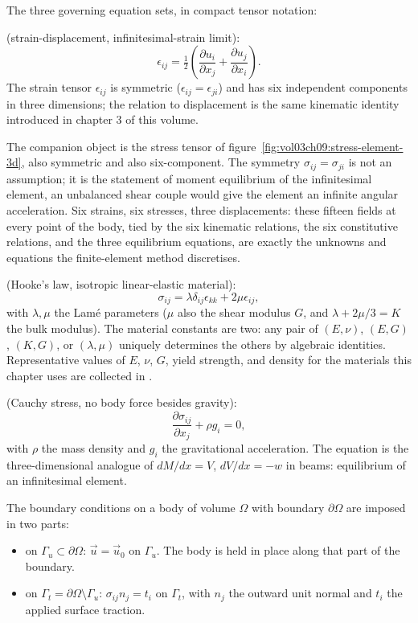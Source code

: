 The three governing equation sets, in compact tensor notation:

 (strain-displacement, infinitesimal-strain
limit):
\[
\epsilon_{ij} = \tfrac{1}{2}\left(\frac{\partial u_i}{\partial x_j}
+ \frac{\partial u_j}{\partial x_i}\right).
\]
The strain tensor $\epsilon_{ij}$ is symmetric ($\epsilon_{ij} =
\epsilon_{ji}$) and has six independent components in three
dimensions; the relation to displacement is the same kinematic
identity introduced in chapter 3 of this volume.



The companion object is the stress tensor of
figure~\ref{fig:vol03ch09:stress-element-3d}, also symmetric and also
six-component. The symmetry $\sigma_{ij} = \sigma_{ji}$ is not an
assumption; it is the statement of moment equilibrium of the
infinitesimal element, an unbalanced shear couple would give the
element an infinite angular acceleration. Six strains, six stresses,
three displacements: these fifteen fields at every point of the body,
tied by the six kinematic relations, the six constitutive relations,
and the three equilibrium equations, are exactly the unknowns and
equations the finite-element method discretises.

 (Hooke's law, isotropic linear-elastic
material):
\[
\sigma_{ij} = \lambda \delta_{ij} \epsilon_{kk} + 2 \mu
\epsilon_{ij},
\]
with $\lambda, \mu$ the Lam{\'e} parameters ($\mu$ also the shear
modulus $G$, and $\lambda + 2\mu/3 = K$ the bulk modulus). The
material constants are two: any pair of $(E, \nu)$, $(E, G)$,
$(K, G)$, or $(\lambda, \mu)$ uniquely determines the others by
algebraic identities. Representative values of $E$, $\nu$, $G$, yield
strength, and density for the materials this chapter uses are
collected in .

 (Cauchy stress, no body force besides
gravity):
\[
\frac{\partial \sigma_{ij}}{\partial x_j} + \rho g_i = 0,
\]
with $\rho$ the mass density and $g_i$ the gravitational
acceleration. The equation is the three-dimensional analogue of
$dM/dx = V$, $dV/dx = -w$ in beams: equilibrium of an
infinitesimal element.

The boundary conditions on a body of volume $\Omega$ with boundary
$\partial\Omega$ are imposed in two parts:

\begin{itemize}[leftmargin=*]
  \item {} on
    $\Gamma_u \subset \partial\Omega$: $\vec{u} = \vec{u}_0$ on
    $\Gamma_u$. The body is held in place along that part of the
    boundary.
  \item {} on
    $\Gamma_t = \partial\Omega \setminus \Gamma_u$: $\sigma_{ij}
    n_j = t_i$ on $\Gamma_t$, with $n_j$ the outward unit normal
    and $t_i$ the applied surface traction.
\end{itemize}

